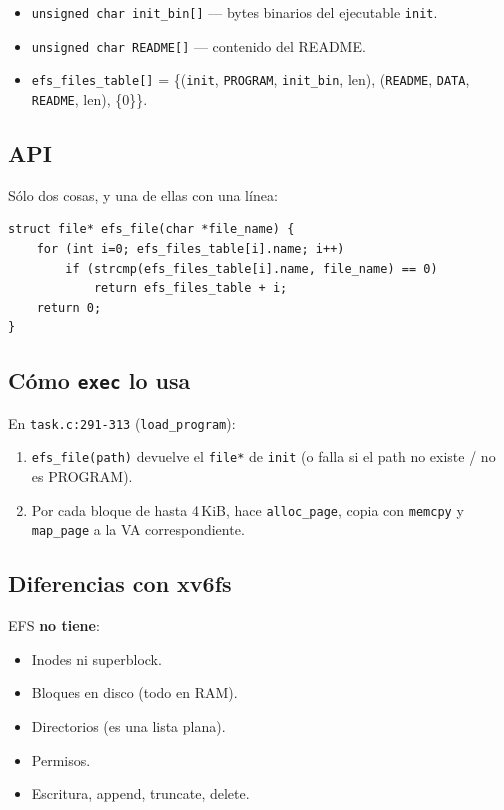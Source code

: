 \documentclass[11pt,a4paper]{article}
\begin{document}
\begin{itemize}[nosep,leftmargin=*]
    \item \texttt{unsigned char init\_bin[]} — bytes binarios del
        ejecutable \texttt{init}.
    \item \texttt{unsigned char README[]} — contenido del README.
    \item \texttt{efs\_files\_table[]} = \{(\texttt{init},
        \texttt{PROGRAM}, \texttt{init\_bin}, len), (\texttt{README},
        \texttt{DATA}, \texttt{README}, len), \{0\}\}.
\end{itemize}

\subsection*{API}

Sólo dos cosas, y una de ellas con una línea:

\begin{lstlisting}[style=cstyle]
struct file* efs_file(char *file_name) {
    for (int i=0; efs_files_table[i].name; i++)
        if (strcmp(efs_files_table[i].name, file_name) == 0)
            return efs_files_table + i;
    return 0;
}
\end{lstlisting}

\subsection*{Cómo \texttt{exec} lo usa}

En \texttt{task.c:291-313} (\texttt{load\_program}):

\begin{enumerate}[nosep,leftmargin=*]
    \item \texttt{efs\_file(path)} devuelve el \texttt{file*} de
        \texttt{init} (o falla si el path no existe / no es PROGRAM).
    \item Por cada bloque de hasta 4\,KiB, hace
        \texttt{alloc\_page}, copia con \texttt{memcpy} y
        \texttt{map\_page} a la VA correspondiente.
\end{enumerate}

\subsection*{Diferencias con xv6fs}

EFS \textbf{no tiene}:

\begin{itemize}[nosep,leftmargin=*]
    \item Inodes ni superblock.
    \item Bloques en disco (todo en RAM).
    \item Directorios (es una lista plana).
    \item Permisos.
    \item Escritura, append, truncate, delete.
\end{itemize}
\end{document}
